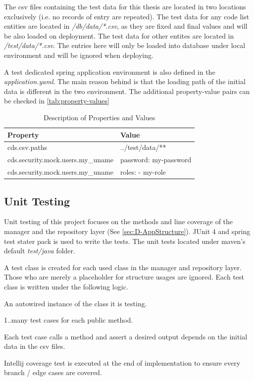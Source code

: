 The csv files containing the test data for this thesis are located in two locations exclusively (i.e. no records of entry are repeated). The test data for any code list entities are located in \textit{/db/data/*.csv}, as they are fixed and final values and will be also loaded on deployment. The test data for other entites are located in \textit{/test/data/*.csv}. The entries here will only be loaded into database under local environment and will be ignored when deploying.

A test dedicated spring application environment is also defined in the \textit{application.yaml}. The main reason behind is that the loading path of the initial data is different in the two environment.
The additional property-value pairs can be checked in \autoref{tab:property-values}

\begin{table}[ht]
\centering
\begin{tabular}{|l|l|}
\hline
\textbf{Property} & \textbf{Value} \\
\hline
cds.csv.paths & ../test/data/** \\
cds.security.mock.users.my\_uname & password: my-password \\
cds.security.mock.users.my\_uname & roles: - my-role \\
\hline
\end{tabular}
\caption{Description of Properties and Values}
\label{tab:property-values}
\end{table}


\subsection{Unit Testing}
\label{subsec:test-unit}

Unit testing \cite{unit-test} of this project focuses on the methods and line coverage of the manager and the repository layer (See \autoref{sec:D-AppStructure}). JUnit 4 \cite{junit} and spring test \cite{spring-testing} stater pack is used to write the tests. The unit tests located under maven's default \textit{test/java} folder. 

\bigskip
A test class is created for each used class in the manager and repository layer. Those who are merely a placeholder for structure usages are ignored. Each test class is written under the following logic.

\begin{compactenum}
	\item An autowired instance of the class it is testing.
    \item 1..many test cases for each public method.
    \item Each test case calls a method and assert a desired output depends on the initial data in the csv files.
    \item Intellij coverage test is executed at the end of implementation to ensure every branch / edge cases are covered.
\end{compactenum}

